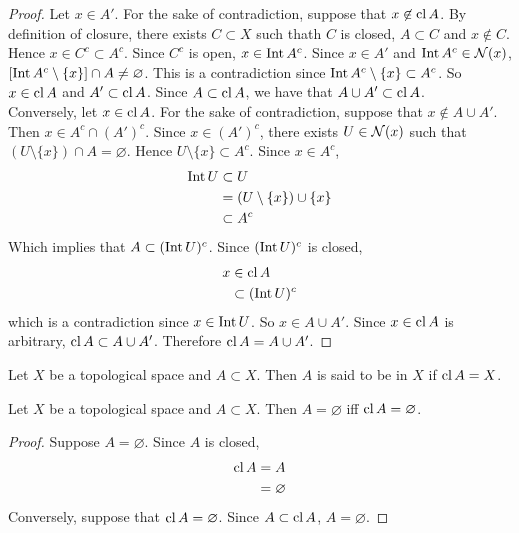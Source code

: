 \documentclass{book}
\begin{document}
	\begin{proof}
	Let $x \in A'$. For the sake of contradiction, suppose that $x \not \in \operatorname{cl} A$. By definition of closure, there exists $C \subset X$ such thath $C$ is closed, $A \subset C$ and $x \not \in C$. Hence $x \in C^c \subset A^c$. Since $C^c$ is open, $x \in \operatorname{Int} A^c$. Since $x \in A'$ and $\operatorname{Int} A^c \in \mathcal{N}(x)$, $[\operatorname{Int} A^c \setminus \{x\}] \cap A \neq \varnothing$. This is a contradiction since $\operatorname{Int} A^c \setminus \{x\} \subset A^c$. So $x \in \operatorname{cl} A$ and $A' \subset \operatorname{cl} A$. Since $A \subset \operatorname{cl} A$, we have that $A \cup A' \subset \operatorname{cl} A $.\\ 
	Conversely, let $x \in \operatorname{cl} A$. For the sake of contradiction, suppose that $x \not \in A \cup A'$. Then $x \in A^c \cap (A')^c$. Since $x \in (A')^c$, there exists $U \in \mathcal{N}(x)$ such that $(U \setminus \{x\}) \cap A = \varnothing$. Hence $U \setminus \{x\} \subset A^c$. Since $x \in A^c$, 
	\begin{align*}
	\operatorname{Int} U 
	& \subset U \\ 
	&= (U \setminus \{x\}) \cup \{x\} \\
	& \subset A^c
\end{align*}	
	Which implies that $A \subset (\operatorname{Int} U)^c$. Since $(\operatorname{Int} U)^c$ is closed, 
	\begin{align*}
		x 
		& \in \operatorname{cl} A \\
		& \subset (\operatorname{Int} U)^c 
	\end{align*}
	which is a contradiction since $x \in \operatorname{Int} U$. So $x \in A \cup A'$. Since $x \in \operatorname{cl} A$ is arbitrary, $\operatorname{cl} A \subset A \cup A'$. Therefore $\operatorname{cl} A = A \cup A'$.
	\end{proof}
	
	\begin{defn}  
		Let $X$ be a topological space and $A \subset X$. Then $A$ is said to be  in $X$ if $\operatorname{cl} A = X$. 
	\end{defn}

	\begin{ex}  
		Let $X$ be a topological space and $A \subset X$. Then $A = \varnothing$ iff $\operatorname{cl} A = \varnothing$. 
	\end{ex}

	\begin{proof}
		Suppose $A = \varnothing$. Since $A$ is closed, 
		\begin{align*}
			\operatorname{cl} A 
			& = A \\
			& = \varnothing
		\end{align*}
	Conversely, suppose that $\operatorname{cl} A = \varnothing$. Since $A \subset \operatorname{cl} A$, $A = \varnothing$. 
	\end{proof}
\end{document}
